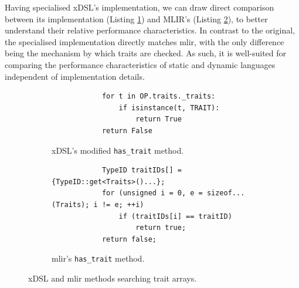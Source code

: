 Having specialised xDSL's implementation, we can draw direct comparison between its implementation (Listing \ref{listing:ubenchmark-trait-checks-both-xdsl}) and MLIR's (Listing \ref{listing:ubenchmark-trait-checks-both-mlir}), to better understand their relative performance characteristics.
In contrast to the original, the specialised implementation directly matches \ac{mlir}, with the only difference being the mechanism by which traits are checked.
As such, it is well-suited for comparing the performance characteristics of static and dynamic languages independent of implementation details.

\begin{figure}[H]
    \centering
    \begin{subfigure}[b]{0.45\textwidth}
       \centering
        \begin{verbatim}
            for t in OP.traits._traits:
                if isinstance(t, TRAIT):
                    return True
            return False
        \end{verbatim}
        \footnotesize\vspace{2em}
        \captionsetup{name=Listing}
        \caption{xDSL's modified \texttt{has_trait} method.}
        \label{listing:ubenchmark-trait-checks-both-xdsl}
    \end{subfigure}
    \hfill
    \begin{subfigure}[b]{0.45\textwidth}
        \centering
        \begin{verbatim}
            TypeID traitIDs[] = {TypeID::get<Traits>()...};
            for (unsigned i = 0, e = sizeof...(Traits); i != e; ++i)
                if (traitIDs[i] == traitID)
                    return true;
            return false;
        \end{verbatim}
        \captionsetup{name=Listing}
        \caption{\ac{mlir}'s \texttt{has_trait} method.}
        \label{listing:ubenchmark-trait-checks-both-mlir}
    \end{subfigure}
    \vspace{1em}
    \captionsetup{name=Listing}
    \caption{xDSL and \ac{mlir} methods searching trait arrays.}
    \label{listing:ubenchmark-trait-checks-both}
\end{figure}

